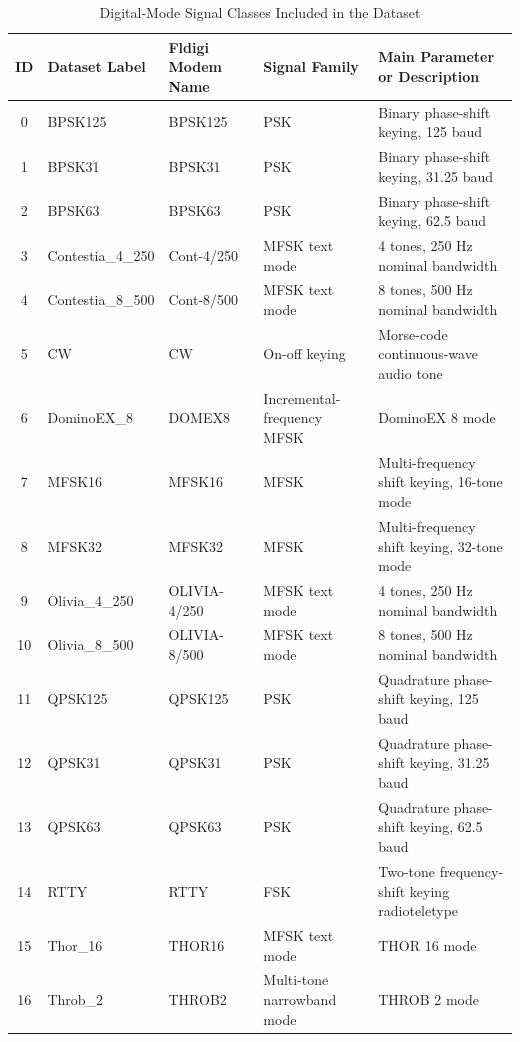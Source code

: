 \begin{table}[!t]
\caption{Digital-Mode Signal Classes Included in the Dataset}
\label{tab:signal_modes}
\centering
\footnotesize
\setlength{\tabcolsep}{3pt}
\renewcommand{\arraystretch}{1.12}
\begin{tabular}{clp{}p{}p{}}
\hline
\hline
ID & Dataset Label & Fldigi Modem Name & Signal Family & Main Parameter or Description \\
\hline
0 & BPSK125 & BPSK125 & PSK & Binary phase-shift keying, 125 baud \\
1 & BPSK31 & BPSK31 & PSK & Binary phase-shift keying, 31.25 baud \\
2 & BPSK63 & BPSK63 & PSK & Binary phase-shift keying, 62.5 baud \\
3 & Contestia\_4\_250 & Cont-4/250 & MFSK text mode & 4 tones, 250 Hz nominal bandwidth \\
4 & Contestia\_8\_500 & Cont-8/500 & MFSK text mode & 8 tones, 500 Hz nominal bandwidth \\
5 & CW & CW & On-off keying & Morse-code continuous-wave audio tone \\
6 & DominoEX\_8 & DOMEX8 & Incremental-frequency MFSK & DominoEX 8 mode \\
7 & MFSK16 & MFSK16 & MFSK & Multi-frequency shift keying, 16-tone mode \\
8 & MFSK32 & MFSK32 & MFSK & Multi-frequency shift keying, 32-tone mode \\
9 & Olivia\_4\_250 & OLIVIA-4/250 & MFSK text mode & 4 tones, 250 Hz nominal bandwidth \\
10 & Olivia\_8\_500 & OLIVIA-8/500 & MFSK text mode & 8 tones, 500 Hz nominal bandwidth \\
11 & QPSK125 & QPSK125 & PSK & Quadrature phase-shift keying, 125 baud \\
12 & QPSK31 & QPSK31 & PSK & Quadrature phase-shift keying, 31.25 baud \\
13 & QPSK63 & QPSK63 & PSK & Quadrature phase-shift keying, 62.5 baud \\
14 & RTTY & RTTY & FSK & Two-tone frequency-shift keying radioteletype \\
15 & Thor\_16 & THOR16 & MFSK text mode & THOR 16 mode \\
16 & Throb\_2 & THROB2 & Multi-tone narrowband mode & THROB 2 mode \\
\hline
\hline
\end{tabular}
\end{table}
